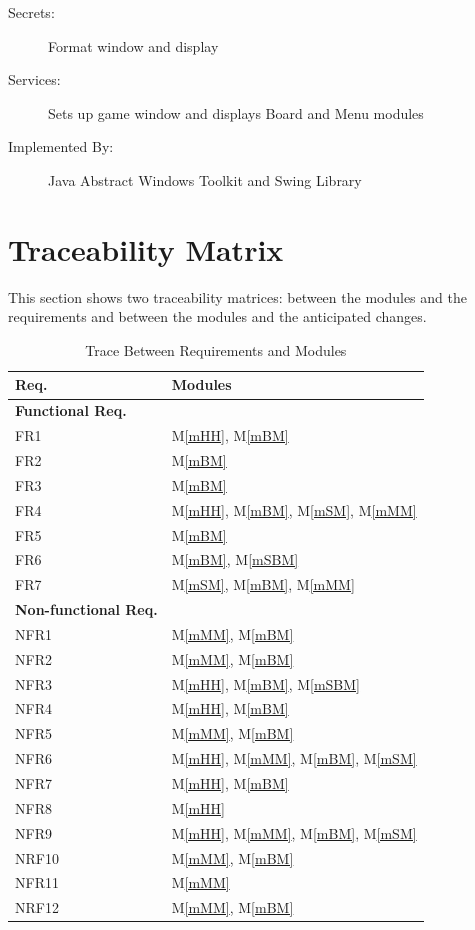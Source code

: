 \documentclass[12pt, titlepage]{article}
\newcommand{\mref}[1]{M\ref{#1}}
\begin{document}
\begin{description}
\item[Secrets:] Format window and display
\item[Services:] Sets up game window and displays Board and Menu modules
\item[Implemented By:] Java Abstract Windows Toolkit and Swing Library
\end{description}

\section{Traceability Matrix} \label{SecTM}

This section shows two traceability matrices: between the modules and the
requirements and between the modules and the anticipated changes.

\begin{table}[H]
\centering
\begin{tabular}{p{} p{}}
\toprule
\textbf{Req.} & \textbf{Modules}\\
\midrule
\textbf{Functional Req.}\\
\midrule
FR1 & \mref{mHH}, \mref{mBM}\\
FR2 & \mref{mBM}\\
FR3 & \mref{mBM}\\
FR4 & \mref{mHH}, \mref{mBM}, \mref{mSM}, \mref{mMM}\\
FR5 & \mref{mBM}\\
FR6 & \mref{mBM}, \mref{mSBM}\\
FR7 & \mref{mSM}, \mref{mBM}, \mref{mMM}\\
\midrule
\textbf{Non-functional Req.}\\
\midrule
NFR1 & \mref{mMM}, \mref{mBM}\\
NFR2 & \mref{mMM}, \mref{mBM}\\
NFR3 & \mref{mHH}, \mref{mBM}, \mref{mSBM}\\
NFR4 & \mref{mHH}, \mref{mBM}\\
NFR5 & \mref{mMM}, \mref{mBM}\\
NFR6 & \mref{mHH}, \mref{mMM}, \mref{mBM}, \mref{mSM}\\
NFR7 & \mref{mHH}, \mref{mBM}\\
NFR8 & \mref{mHH}\\
NFR9 & \mref{mHH}, \mref{mMM}, \mref{mBM}, \mref{mSM}\\
NRF10 & \mref{mMM}, \mref{mBM}\\
NFR11 & \mref{mMM}\\
NRF12 & \mref{mMM}, \mref{mBM}\\
\bottomrule
\end{tabular}

\caption{Trace Between Requirements and Modules}
\label{TblRT}
\end{table}
\end{document}
